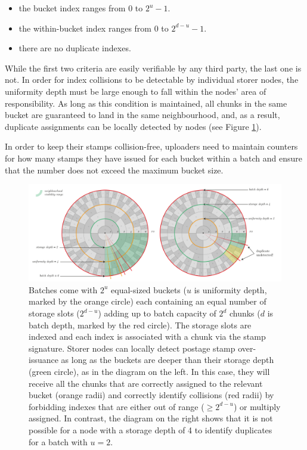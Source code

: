 \begin{itemize}
\item the bucket index ranges from $0$ to $2^u - 1$. 
\item the within-bucket index ranges from $0$ to $2^{d-u} - 1$. 
\item there are no duplicate indexes. 
\end{itemize}

While the first two criteria are easily verifiable by any third party, the last one is not. In order for index collisions to be detectable by individual storer nodes, the uniformity depth must be large enough to fall within the nodes' area of responsibility.
As long as this condition is maintained, all chunks in the same bucket are guaranteed to land in the same neighbourhood, and, as a result, duplicate assignments can be locally detected by nodes (see Figure \ref{fig:over-issuance}).

In order to keep their stamps collision-free, uploaders need to maintain counters for how many stamps they have issued for each bucket within a batch and ensure that the number does not exceed the maximum bucket size. 

\begin{figure}[!ht]
  \centering
    \includegraphics[width=1\textwidth]{fig/batch-structure.pdf}
  \caption[Batch structure, uniformity and over-issuance]{Batches come with $2^u$ equal-sized buckets ($u$ is uniformity depth, marked by the orange circle) each containing an equal number of storage slots ($2^{d-u}$) adding up to batch capacity of $2^d$ chunks ($d$ is batch depth, marked by the red circle). The storage slots are indexed and each index is associated with a chunk via the stamp signature. Storer nodes can locally detect postage stamp over-issuance as long as the buckets are deeper than their storage depth (green circle), as in the diagram on the left. In this case, they will receive all the chunks that are correctly assigned to the relevant bucket (orange radii) and correctly identify collisions (red radii) by forbidding indexes that are either out of range ($\geq 2^{d-u}$) or multiply assigned. In contrast, the diagram on the right shows that it is not possible for a node with a storage depth of 4 to identify duplicates for a batch with $u=2$.}
\label{fig:over-issuance}
\end{figure}    



